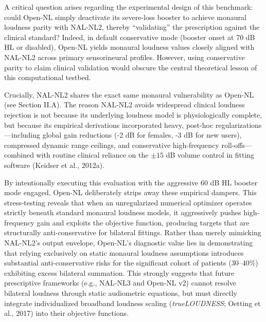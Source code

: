 \documentclass[
  12pt,
]{article}
\begin{document}
A critical question arises regarding the experimental design of this
benchmark: could Open-NL simply deactivate its severe-loss booster to
achieve monaural loudness parity with NAL-NL2, thereby ``validating''
the prescription against the clinical standard? Indeed, in default
conservative mode (booster onset at 70 dB HL or disabled), Open-NL
yields monaural loudness values closely aligned with NAL-NL2 across
primary sensorineural profiles. However, using conservative parity to
claim clinical validation would obscure the central theoretical lesson
of this computational testbed.

Crucially, NAL-NL2 shares the exact same monaural vulnerability as
Open-NL (see Section II.A). The reason NAL-NL2 avoids widespread
clinical loudness rejection is not because its underlying loudness model
is physiologically complete, but because its empirical derivations
incorporated heavy, post-hoc regularizations---including global gain
reductions (-2 dB for females, -3 dB for new users), compressed dynamic
range ceilings, and conservative high-frequency roll-offs---combined
with routine clinical reliance on the \(\pm 15\) dB volume control in
fitting software (Keidser et al., 2012a).

By intentionally executing this evaluation with the aggressive 60 dB HL
booster mode engaged, Open-NL deliberately strips away these empirical
dampers. This stress-testing reveals that when an unregularized
numerical optimizer operates strictly beneath standard monaural loudness
models, it aggressively pushes high-frequency gain and exploits the
objective function, producing targets that are structurally
anti-conservative for bilateral fittings. Rather than merely mimicking
NAL-NL2's output envelope, Open-NL's diagnostic value lies in
demonstrating that relying exclusively on static monaural loudness
assumptions introduces substantial anti-conservative risks for the
significant cohort of patients (30--40\%) exhibiting excess bilateral
summation. This strongly suggests that future prescriptive frameworks
(e.g., NAL-NL3 and Open-NL v2) cannot resolve bilateral loudness through
static audiometric equations, but must directly integrate individualized
broadband loudness scaling (\emph{trueLOUDNESS}; Oetting et al., 2017)
into their objective functions.
\end{document}
